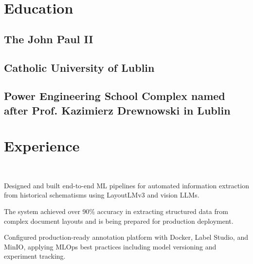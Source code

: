 \documentclass[]{deedy-resume-openfont}
\begin{document}
\begin{minipage}[t]{0.55\textwidth} 

\section{Education} 
\subsection{The John Paul II}
\subsection{Catholic University of Lublin}
\sectionsep 

\subsection{Power Engineering School Complex named after Prof. Kazimierz Drewnowski in Lublin}
\sectionsep




\section{Experience}

 \\
\vspace{\topsep} %
\begin{tightemize}
\item Designed and built end-to-end ML pipelines for automated information extraction from historical schematisms using LayoutLMv3 and vision LLMs.
\item The system achieved over 90\% accuracy in extracting structured data from complex document layouts and is being prepared for production deployment.
\item Configured production-ready annotation platform with Docker, Label Studio, and MinIO, applying MLOps best practices including model versioning and experiment tracking.
\end{tightemize}
\sectionsep


\end{minipage}
\end{document}
